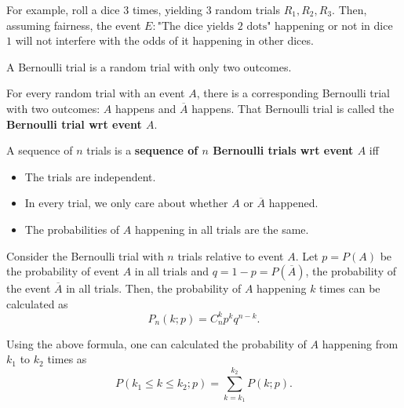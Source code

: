 For example, roll a dice \( 3 \) times, yielding \( 3 \) random trials \( R_{1},
R_{2}, R_{3}\). Then, assuming fairness, the event \( E: \text{"The dice yields
2 dots"} \) happening or not in dice \( 1 \) will not interfere with the odds of
it happening in other dices.

\begin{definition}
\label{def:Bernoulli trials}
  A Bernoulli trial is a random trial with only two outcomes.
\end{definition}

For every random trial with an event \( A \), there is a corresponding Bernoulli
trial with two outcomes: \( A \) happens and \( \overline{A} \) happens. That
Bernoulli trial is called the \textbf{Bernoulli trial wrt event \( A \)}.

\begin{definition}
\label{def:Sequence of Bernoulli trials}
  A sequence of \( n \) trials is a \textbf{sequence of \( n \) Bernoulli trials
  wrt event \( A \)} iff
  \begin{itemize}
  \item The trials are independent.
  \item In every trial, we only care about whether \( A \) or \(
    \overline{A} \) happened.
  \item The probabilities of \( A \) happening in all trials are the same.
  \end{itemize}
\end{definition}

\begin{theorem}
\label{thr:Binomial Distribution Theorem}
Consider the Bernoulli trial with \( n \) trials relative to event \( A \).
Let \( p = P(A) \) be the probability of event \( A \) in all trials and \( q =
1 - p = P(\overline{A})\), the probability of the event \( \overline{A} \) in
all trials.
Then, the probability of \( A \) happening \( k \) times can be calculated as
\[
  P_{n}(k; p) = C_{n}^{k}p^{k}q^{n-k}
.\]

Using the above formula, one can calculated the probability of \( A \) happening
from \( k_{1} \) to \( k_{2} \) times as
\[
  P(k_{1} \le k \le  k_{2}; p) = \sum_{k = k_{1}}^{k_{2}} P(k; p)
.\] 
\end{theorem}



